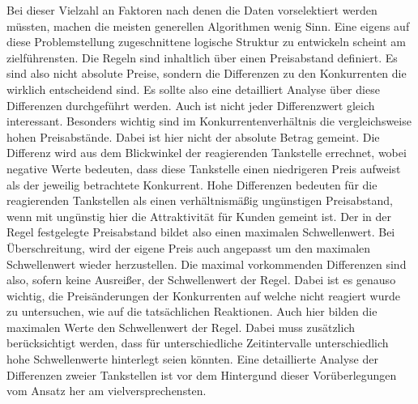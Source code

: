 \documentclass[12pt,a4paper,bibliography=totocnumbered,listof=totocnumbered]{scrartcl}
\begin{document}
Bei dieser Vielzahl an Faktoren nach denen die Daten vorselektiert werden müssten, machen die meisten generellen Algorithmen wenig Sinn. Eine eigens auf diese Problemstellung zugeschnittene logische Struktur zu entwickeln scheint am zielführensten. Die Regeln sind inhaltlich über einen Preisabstand definiert. Es sind also nicht absolute Preise, sondern die Differenzen zu den Konkurrenten die wirklich entscheidend sind. Es sollte also eine detailliert Analyse über diese Differenzen durchgeführt werden. Auch ist nicht jeder Differenzwert gleich interessant. Besonders wichtig sind im Konkurrentenverhältnis die vergleichsweise hohen Preisabstände. Dabei ist hier nicht der absolute Betrag gemeint. Die Differenz wird aus dem Blickwinkel der reagierenden Tankstelle errechnet, wobei negative Werte bedeuten, dass diese Tankstelle einen niedrigeren Preis aufweist als der jeweilig betrachtete Konkurrent. Hohe Differenzen bedeuten für die reagierenden Tankstellen als einen verhältnismäßig ungünstigen Preisabstand, wenn mit ungünstig hier die Attraktivität für Kunden gemeint ist. Der in der Regel festgelegte Preisabstand bildet also einen maximalen Schwellenwert. Bei Überschreitung, wird der eigene Preis auch angepasst um den maximalen Schwellenwert wieder herzustellen. Die maximal vorkommenden Differenzen sind also, sofern keine Ausreißer, der Schwellenwert der Regel. Dabei ist es genauso wichtig, die Preisänderungen der Konkurrenten auf welche nicht reagiert wurde zu untersuchen, wie auf die tatsächlichen Reaktionen. Auch hier bilden die maximalen Werte den Schwellenwert der Regel. Dabei muss zusätzlich berücksichtigt werden, dass für unterschiedliche Zeitintervalle unterschiedlich hohe Schwellenwerte hinterlegt seien könnten. Eine detaillierte Analyse der Differenzen zweier Tankstellen ist vor dem Hintergund dieser Vorüberlegungen vom Ansatz her am vielversprechensten. 

\end{document}
